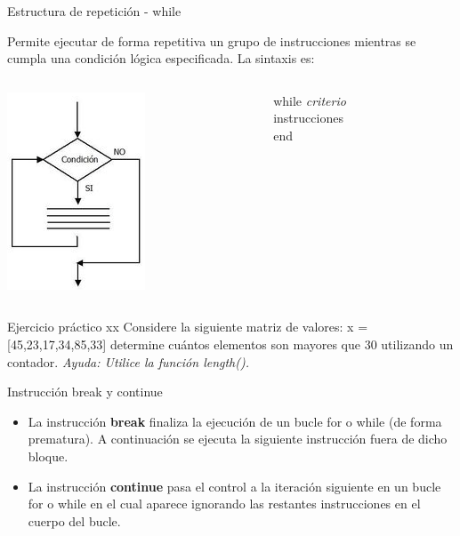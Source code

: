 \documentclass{bredelebeamer}
\begin{document}
\begin{frame}{Estructura de repetición - while}
\begin{center}
Permite ejecutar de forma repetitiva un grupo de instrucciones mientras se cumpla una condición lógica especificada. La sintaxis es:
\end{center}
\begin{columns}
\begin{column}{0.5\textwidth}
\begin{center}
\includegraphics[scale=0.7]{images/pantalla9.png}
\end{center}
\end{column}
\begin{column}{0.3\textwidth}
while \textit{criterio}\\
   instrucciones\\
end
\end{column}
\end{columns}
\end{frame}

\begin{frame}{Ejercicio práctico xx}
Considere la siguiente matriz de valores: x = [45,23,17,34,85,33] determine cuántos elementos son mayores que 30 utilizando un contador. \textit{Ayuda: Utilice la función length().}
\end{frame}

\begin{frame}{Instrucción break y continue}
\begin{itemize}
\item La instrucción \textbf{break} finaliza la ejecución de un bucle for o while (de forma prematura). A continuación se ejecuta la siguiente instrucción fuera de dicho bloque.
\item La instrucción \textbf{continue} pasa el control a la iteración siguiente en un bucle for o while en el cual aparece ignorando las restantes instrucciones en el cuerpo del bucle.
\end{itemize}
\end{frame}
\end{document}
